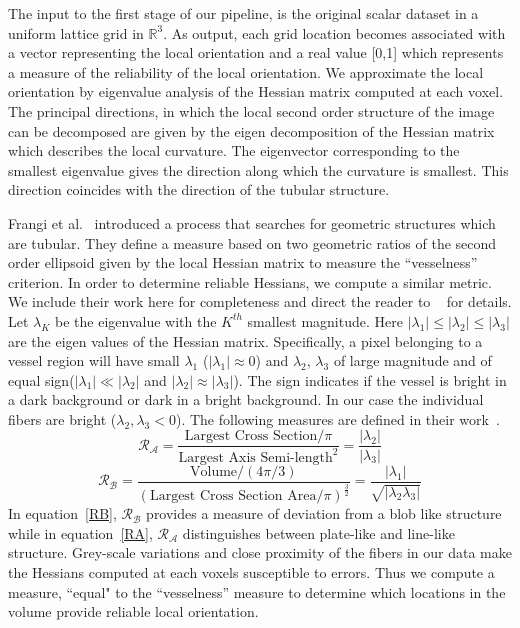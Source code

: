The input to the first stage of our pipeline, is the original scalar dataset in a uniform lattice grid in $\mathbb{R}^3$. As output, each grid location becomes associated with a vector representing the local orientation and a real value [0,1] which represents a measure of the reliability of the local orientation. We approximate the local orientation by eigenvalue analysis of the Hessian matrix computed at each voxel. The principal directions, in which the local second order structure of the image can be decomposed are given by the eigen decomposition of the Hessian matrix which describes the local curvature.
The eigenvector corresponding to the smallest eigenvalue gives the direction along which the curvature is smallest. This direction coincides with the direction of the tubular structure.

Frangi et al.~\cite{Frangi1998} introduced a process that searches for geometric structures which are tubular. They define a measure based on two geometric ratios of the second order ellipsoid given by the local Hessian matrix to measure the ``vesselness'' criterion.  In order to determine reliable Hessians, we compute a similar metric. We include their work here for completeness and direct the reader to ~\cite{Frangi1998} for details. Let $\lambda_{K}$ be the eigenvalue with the $K^{th}$ smallest magnitude. Here $|{\lambda}_{1}| \leq| {\lambda}_{2}|\leq| {\lambda}_{3}| $ are the eigen values of the Hessian matrix. Specifically, a pixel belonging to a vessel region will have small $\lambda_{1}$ ($|\lambda_{1}|\approx 0$) and $\lambda_{2}$, $\lambda_{3}$ of large magnitude and of equal sign($|\lambda_{1}| \ll |\lambda_{2}|$ and $|\lambda_{2}|\approx |\lambda_{3}|$). The sign indicates if the vessel is bright in a dark background or dark in a bright background. In our case the individual fibers are bright ($\lambda_2,\lambda_3 < 0$).  The following measures are defined in their work~\cite{Frangi1998}.  
\begin{equation}\label{RA}
\mathcal{R_{A}}=\frac{\textrm{Largest  Cross Section}\big/ \pi}{{\textrm{Largest Axis Semi-length}}^{2}}=\frac{|\lambda_{2}|}{|\lambda_{3}|}
\end{equation}
\begin{equation}\label{RB}
\mathcal{R_{B}}=\frac{\textrm{Volume}\big/ (4\pi \big/ 3)}{{(\textrm{Largest Cross Section Area}\big/ \pi)}^{\frac{3}{2}}}=\frac{|\lambda_{1}|}{\sqrt{|\lambda_{2}\lambda_{3}|}}
\end{equation}
In equation~\ref{RB}, $\mathcal{R_{B}}$ provides a measure of deviation from a blob like structure while in equation~\ref{RA}, $\mathcal{R_{A}}$ distinguishes between plate-like and line-like structure. Grey-scale variations and close proximity of the fibers in our data make the Hessians computed at each voxels susceptible to errors. Thus we compute a measure, ``equal" to the ``vesselness'' measure to determine which locations in the volume provide reliable local orientation.
